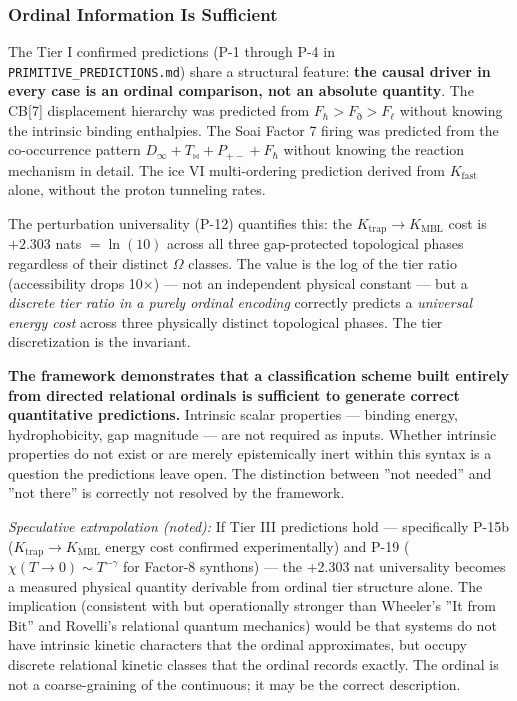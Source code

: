 \documentclass[12pt,a4paper]{article}
\begin{document}
\subsubsection{Ordinal Information Is Sufficient}

The Tier I confirmed predictions (P-1 through P-4 in \texttt{PRIMITIVE\_PREDICTIONS.md}) share a structural feature: \textbf{the causal driver in every case is an ordinal comparison, not an absolute quantity}. The CB{[}7{]} displacement hierarchy was predicted from $F_\hbar > F_\eth > F_\ell$ without knowing the intrinsic binding enthalpies. The Soai Factor 7 firing was predicted from the co-occurrence pattern $D_{\infty} + T_{\bowtie} + P_{+-} + F_{\hbar}$ without knowing the reaction mechanism in detail. The ice VI multi-ordering prediction derived from $K_\text{fast}$ alone, without the proton tunneling rates.

The perturbation universality (P-12) quantifies this: the $K_\text{trap} \to K_\text{MBL}$ cost is $+2.303$ nats $= \ln(10)$ across all three gap-protected topological phases regardless of their distinct $\Omega$ classes. The value is the log of the tier ratio (accessibility drops 10$\times$) --- not an independent physical constant --- but a \emph{discrete tier ratio in a purely ordinal encoding} correctly predicts a \emph{universal energy cost} across three physically distinct topological phases. The tier discretization is the invariant.

\textbf{The framework demonstrates that a classification scheme built entirely from directed relational ordinals is sufficient to generate correct quantitative predictions.} Intrinsic scalar properties --- binding energy, hydrophobicity, gap magnitude --- are not required as inputs. Whether intrinsic properties do not exist or are merely epistemically inert within this syntax is a question the predictions leave open. The distinction between ''not needed'' and ''not there'' is correctly not resolved by the framework.

\emph{Speculative extrapolation (noted):} If Tier III predictions hold --- specifically P-15b ($K_\text{trap} \to K_\text{MBL}$ energy cost confirmed experimentally) and P-19 ($\chi(T \to 0) \sim T^{-\gamma}$ for Factor-8 synthons) --- the +2.303 nat universality becomes a measured physical quantity derivable from ordinal tier structure alone. The implication (consistent with but operationally stronger than Wheeler's ''It from Bit'' and Rovelli's relational quantum mechanics) would be that systems do not have intrinsic kinetic characters that the ordinal approximates, but occupy discrete relational kinetic classes that the ordinal records exactly. The ordinal is not a coarse-graining of the continuous; it may be the correct description.
\end{document}

